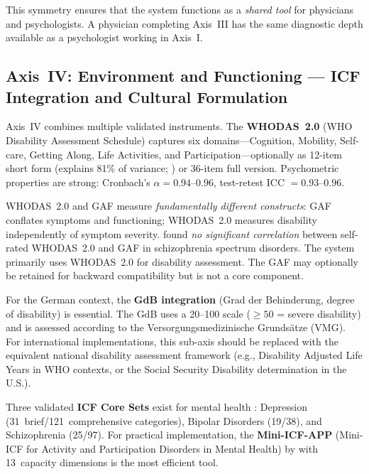\documentclass[11pt,a4paper]{article}
\begin{document}
This symmetry ensures that the system functions as a \textit{shared tool} for physicians and psychologists. A physician completing Axis~III has the same diagnostic depth available as a psychologist working in Axis~I.

\subsection{Axis~IV: Environment and Functioning --- ICF Integration and Cultural Formulation}
\label{sec:axis4}

Axis~IV combines multiple validated instruments. The \textbf{WHODAS~2.0} \citep{WHO2010} (WHO Disability Assessment Schedule) captures six domains---Cognition, Mobility, Self-care, Getting Along, Life Activities, and Participation---optionally as 12-item short form (explains 81\% of variance; \citealp{Luciano2010}) or 36-item full version. Psychometric properties are strong: Cronbach's $\alpha = 0.94$--$0.96$, test-retest ICC $= 0.93$--$0.96$.

WHODAS~2.0 and GAF measure \textit{fundamentally different constructs}: GAF conflates symptoms and functioning; WHODAS~2.0 measures disability independently of symptom severity. \citet{Gspandl2018} found \textit{no significant correlation} between self-rated WHODAS~2.0 and GAF in schizophrenia spectrum disorders. The system primarily uses WHODAS~2.0 for disability assessment. The GAF may optionally be retained for backward compatibility but is not a core component.

For the German context, the \textbf{GdB integration} (Grad der Behinderung, degree of disability) is essential. The GdB uses a 20--100 scale ($\geq 50$ = severe disability) and is assessed according to the Versorgungsmedizinische Grunds\"atze (VMG). For international implementations, this sub-axis should be replaced with the equivalent national disability assessment framework (e.g., Disability Adjusted Life Years in WHO contexts, or the Social Security Disability determination in the U.S.).

Three validated \textbf{ICF Core Sets} exist for mental health \citep{AyusoMateos2010}: Depression (31~brief/121~comprehensive categories), Bipolar Disorders (19/38), and Schizophrenia (25/97). For practical implementation, the \textbf{Mini-ICF-APP} (Mini-ICF for Activity and Participation Disorders in Mental Health) by \citet{LindenBaron2005} with 13~capacity dimensions is the most efficient tool.
\end{document}

